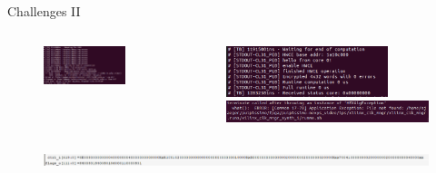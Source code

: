 \documentclass[aspectratio=169, nobackgroundmain]{beamer}
\begin{document}
\begin{frame}[fragile]{Challenges II}
  \begin{columns}
    \begin{column}{0.5\textwidth}
      \begin{figure}
        \centering
        \includegraphics[width=0.9\textwidth]{vsim.png}
      \end{figure}
    \end{column}
    \begin{column}{0.5\textwidth}
      \begin{figure}
        \centering
        \includegraphics[width=0.8\textwidth]{runtime.png}
        \includegraphics[width=\textwidth]{vivado.png}
      \end{figure}
    \end{column}
  \end{columns}
  \begin{figure}
    \centering
    \includegraphics[width=\textwidth]{ctrl_flags.png}
  \end{figure}
\end{frame}
\end{document}

